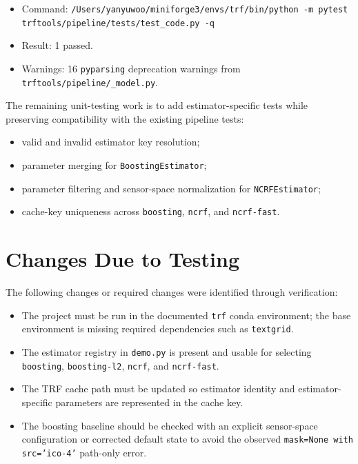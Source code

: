 \documentclass[12pt, titlepage]{article}
\begin{document}
\begin{itemize}
  \item Command: \texttt{/Users/yanyuwoo/miniforge3/envs/trf/bin/python -m pytest trftools/pipeline/tests/test\_code.py -q}
  \item Result: 1 passed.
  \item Warnings: 16 \texttt{pyparsing} deprecation warnings from \texttt{trftools/pipeline/\_model.py}.
\end{itemize}

The remaining unit-testing work is to add estimator-specific tests while preserving compatibility with the existing pipeline tests:

\begin{itemize}
  \item valid and invalid estimator key resolution;
  \item parameter merging for \texttt{BoostingEstimator};
  \item parameter filtering and sensor-space normalization for \texttt{NCRFEstimator};
  \item cache-key uniqueness across \texttt{boosting}, \texttt{ncrf}, and \texttt{ncrf-fast}.
\end{itemize}

\section{Changes Due to Testing}


The following changes or required changes were identified through verification:

\begin{itemize}
  \item The project must be run in the documented \texttt{trf} conda environment; the base environment is missing required dependencies such as \texttt{textgrid}.
  \item The estimator registry in \texttt{demo.py} is present and usable for selecting \texttt{boosting}, \texttt{boosting-l2}, \texttt{ncrf}, and \texttt{ncrf-fast}.
  \item The TRF cache path must be updated so estimator identity and estimator-specific parameters are represented in the cache key.
  \item The boosting baseline should be checked with an explicit sensor-space configuration or corrected default state to avoid the observed \texttt{mask=None with src='ico-4'} path-only error.
\end{itemize}
\end{document}
